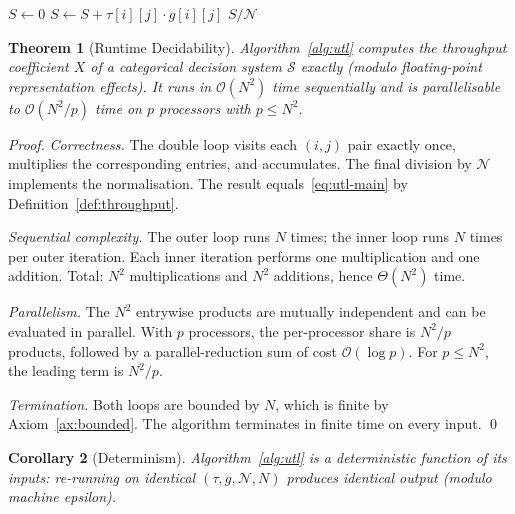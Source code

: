 \documentclass[twocolumn,11pt,a4paper]{article}
\newtheorem{theorem}{Theorem}[section]
\newtheorem{corollary}[theorem]{Corollary}
\newcommand{\TP}{X}
\newcommand{\Norm}{\mathcal{N}}
\newcommand{\lag}{\tau}
\newcommand{\cpl}{g}
\newcommand{\Sys}{\mathcal{S}}
\newcommand{\classcount}{N}
\begin{document}
\begin{algorithm}[H]
\caption{Universal Transport Coefficient}
\label{alg:utl}
\begin{algorithmic}[1]
\Function{Compute}{$\lag, \cpl, \Norm, \classcount$}
  \State $S \gets 0$
  \For{$i = 1$ to $\classcount$}
    \For{$j = 1$ to $\classcount$}
      \State $S \gets S + \lag[i][j] \cdot \cpl[i][j]$
    \EndFor
  \EndFor
  \State \Return $S / \Norm$
\EndFunction
\end{algorithmic}
\end{algorithm}

\begin{theorem}[Runtime Decidability]
\label{thm:runtime}
Algorithm~\ref{alg:utl} computes the throughput coefficient $\TP$ of a categorical decision system $\Sys$ exactly (modulo floating-point representation effects). It runs in $\mathcal{O}(\classcount^2)$ time sequentially and is parallelisable to $\mathcal{O}(\classcount^2 / p)$ time on $p$ processors with $p \leq \classcount^2$.
\end{theorem}

\begin{proof}
\emph{Correctness.} The double loop visits each $(i, j)$ pair exactly once, multiplies the corresponding entries, and accumulates. The final division by $\Norm$ implements the normalisation. The result equals~\eqref{eq:utl-main} by Definition~\ref{def:throughput}.

\emph{Sequential complexity.} The outer loop runs $\classcount$ times; the inner loop runs $\classcount$ times per outer iteration. Each inner iteration performs one multiplication and one addition. Total: $\classcount^2$ multiplications and $\classcount^2$ additions, hence $\Theta(\classcount^2)$ time.

\emph{Parallelism.} The $\classcount^2$ entrywise products are mutually independent and can be evaluated in parallel. With $p$ processors, the per-processor share is $\classcount^2 / p$ products, followed by a parallel-reduction sum of cost $\mathcal{O}(\log p)$. For $p \leq \classcount^2$, the leading term is $\classcount^2 / p$.

\emph{Termination.} Both loops are bounded by $\classcount$, which is finite by Axiom~\ref{ax:bounded}. The algorithm terminates in finite time on every input. \qed
\end{proof}

\begin{corollary}[Determinism]
\label{cor:determinism}
Algorithm~\ref{alg:utl} is a deterministic function of its inputs: re-running on identical $(\lag, \cpl, \Norm, \classcount)$ produces identical output (modulo machine epsilon).
\end{corollary}
\end{document}
